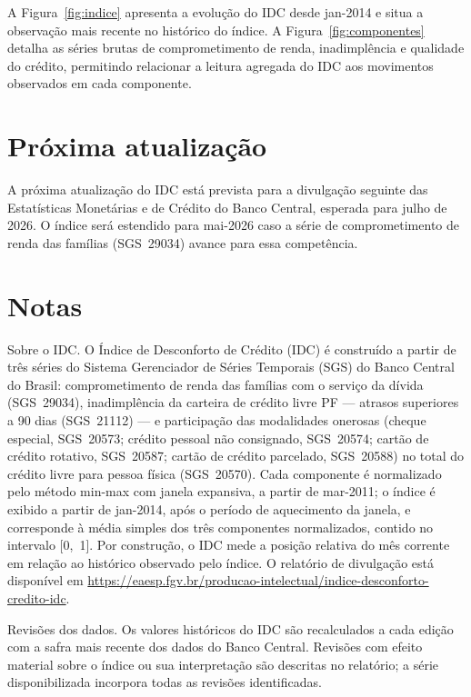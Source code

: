 \documentclass[11pt,a4paper]{article}
\newcommand{\proxdivulgacao}{julho de 2026}                         %
\newcommand{\mesproximo}{mai-2026}                                  %
\newcommand{\janelainicio}{jan-2014}   %
\newcommand{\seriesinicio}{mar-2011}   %
\begin{document}
A Figura~\ref{fig:indice} apresenta a evolução do IDC desde \janelainicio{} e situa a
observação mais recente no histórico do índice. A Figura~\ref{fig:componentes} detalha
as séries brutas de comprometimento de renda, inadimplência e qualidade do crédito,
permitindo relacionar a leitura agregada do IDC aos movimentos observados em cada
componente.

\clearpage
\section{Próxima atualização}

A próxima atualização do IDC está prevista para a divulgação seguinte das Estatísticas
Monetárias e de Crédito do Banco Central, esperada para \proxdivulgacao.
O índice será estendido para \mesproximo{} caso a série de comprometimento de renda das
famílias (SGS~29034) avance para essa competência.

\section*{Notas}

\begingroup\footnotesize

Sobre o IDC. O Índice de Desconforto de Crédito (IDC) é construído a partir de
três séries do Sistema Gerenciador de Séries Temporais (SGS) do Banco Central do Brasil:
comprometimento de renda das famílias com o serviço da dívida (SGS~29034), inadimplência
da carteira de crédito livre PF --- atrasos superiores a 90 dias (SGS~21112) --- e
participação das modalidades onerosas (cheque especial, SGS~20573; crédito pessoal não
consignado, SGS~20574; cartão de crédito rotativo, SGS~20587; cartão de crédito parcelado,
SGS~20588) no total do crédito livre para pessoa física (SGS~20570). Cada componente é
normalizado pelo método min-max com janela expansiva, a partir de \seriesinicio; o índice
é exibido a partir de \janelainicio, após o período de aquecimento da janela, e corresponde
à média simples dos três componentes normalizados, contido no intervalo [0,~1]. Por
construção, o IDC mede a posição relativa do mês corrente em relação ao histórico observado
pelo índice. O relatório de divulgação está disponível em
\url{https://eaesp.fgv.br/producao-intelectual/indice-desconforto-credito-idc}.

Revisões dos dados. Os valores históricos do IDC são recalculados a cada edição
com a safra mais recente dos dados do Banco Central. Revisões com efeito material
sobre o índice ou sua interpretação são descritas no relatório; a série
disponibilizada incorpora todas as revisões identificadas.
\end{document}
